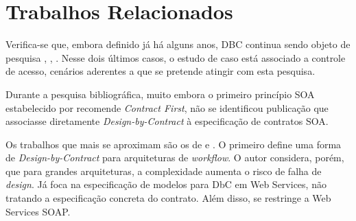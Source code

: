 \section{Trabalhos Relacionados}\label{sec:trabRelacionados}

Verifica-se que, embora definido já há alguns anos, DBC continua
sendo objeto de pesquisa \cite{poyias2014design}, \cite{rubio2013verifying},
\cite{belhaouari2012design}. Nesse dois últimos casos, o estudo de caso está
associado a controle de acesso, cenários aderentes a que se pretende
atingir com esta pesquisa.

Durante a pesquisa bibliográfica, muito embora o primeiro princípio SOA
es\-ta\-be\-le\-ci\-do por \cite{erl2008soa} recomende \textit{Contract First},
não se identificou publicação que associasse diretamente \textit{Design-by-Contract} à
especificação de contratos SOA.

Os trabalhos que mais se aproximam são os de \cite{ling2003describing} e
\cite{heckel2005towards}. O primeiro define uma forma de \textit{Design-by-Contract} para
arquiteturas de \textit{workflow}. O autor considera, porém, que para grandes
arquiteturas, a complexidade aumenta o risco de falha de \textit{design}. Já
\cite{heckel2005towards} foca na especificação de modelos para DbC em Web
Services, não tratando a especificação concreta do contrato. Além disso, se
restringe a Web Services SOAP.

